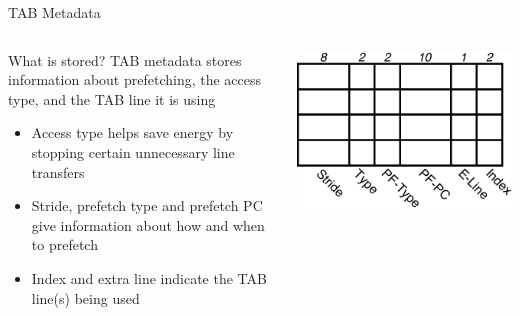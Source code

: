 \documentclass{beamer}
\begin{document}
\begin{frame}{TAB Metadata}
   \begin{columns} %
      \begin{block}{What is stored?}
         TAB metadata stores information about prefetching, the access type,
         and the TAB line it is using
         \begin{itemize}
            \item Access type helps save energy by stopping certain unnecessary 
               line transfers
            \item Stride, prefetch type and prefetch PC give information about how and
               when to prefetch
            \item Index and extra line indicate the TAB line(s) being used
         \end{itemize}
      \end{block}
      \includegraphics[width=\textwidth]{figures/tabmeta.pdf}
   \end{columns}
\end{frame}
\end{document}
